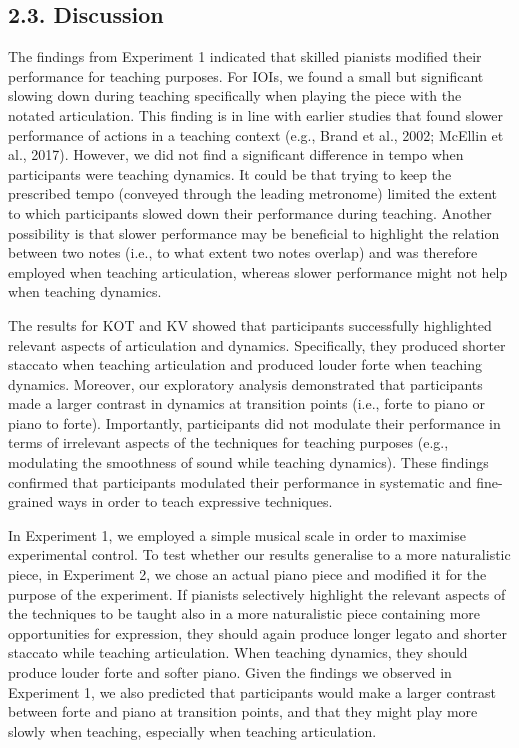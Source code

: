 \documentclass[
  english,
  man,floatsintext]{apa6}
\begin{document}
\hypertarget{discussion}{%
\subsection{2.3. Discussion}\label{discussion}}

The findings from Experiment 1 indicated that skilled pianists modified their performance for teaching purposes. For IOIs, we found a small but significant slowing down during teaching specifically when playing the piece with the notated articulation. This finding is in line with earlier studies that found slower performance of actions in a teaching context (e.g., Brand et al., 2002; McEllin et al., 2017). However, we did not find a significant difference in tempo when participants were teaching dynamics. It could be that trying to keep the prescribed tempo (conveyed through the leading metronome) limited the extent to which participants slowed down their performance during teaching. Another possibility is that slower performance may be beneficial to highlight the relation between two notes (i.e., to what extent two notes overlap) and was therefore employed when teaching articulation, whereas slower performance might not help when teaching dynamics.

The results for KOT and KV showed that participants successfully highlighted relevant aspects of articulation and dynamics. Specifically, they produced shorter staccato when teaching articulation and produced louder forte when teaching dynamics. Moreover, our exploratory analysis demonstrated that participants made a larger contrast in dynamics at transition points (i.e., forte to piano or piano to forte). Importantly, participants did not modulate their performance in terms of irrelevant aspects of the techniques for teaching purposes (e.g., modulating the smoothness of sound while teaching dynamics). These findings confirmed that participants modulated their performance in systematic and fine-grained ways in order to teach expressive techniques.

In Experiment 1, we employed a simple musical scale in order to maximise experimental control. To test whether our results generalise to a more naturalistic piece, in Experiment 2, we chose an actual piano piece and modified it for the purpose of the experiment. If pianists selectively highlight the relevant aspects of the techniques to be taught also in a more naturalistic piece containing more opportunities for expression, they should again produce longer legato and shorter staccato while teaching articulation. When teaching dynamics, they should produce louder forte and softer piano. Given the findings we observed in Experiment 1, we also predicted that participants would make a larger contrast between forte and piano at transition points, and that they might play more slowly when teaching, especially when teaching articulation.
\end{document}
